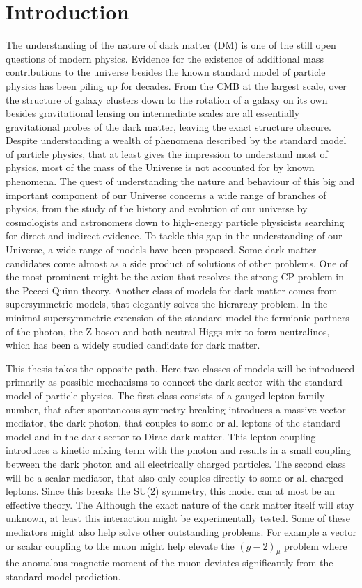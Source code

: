 \chapter{Introduction}
The understanding of the nature of dark matter (DM) is one of the still open questions of modern physics. Evidence for the existence of additional mass contributions to the universe besides the known standard model of particle physics has been piling up for decades. From the CMB at the largest scale, over the structure of galaxy clusters down to the rotation of a galaxy on its own besides gravitational lensing on intermediate scales are all essentially gravitational probes of the dark matter, leaving the exact structure obscure. Despite understanding a wealth of phenomena described by the standard model of particle physics, that at least gives the impression to understand most of physics, most of the mass of the Universe is not accounted for by known phenomena. The quest of understanding the nature and behaviour of this big and important component of our Universe concerns a wide range of branches of physics, from the study of the history and evolution of our universe by cosmologists and astronomers down to high-energy particle physicists searching for direct and indirect evidence.
To tackle this gap in the understanding of our Universe, a wide range of models have been proposed. Some dark matter candidates come almost as a side product of solutions of other problems. One of the most prominent might be the axion that resolves the strong CP-problem in the Peccei-Quinn theory. Another class of models for dark matter comes from supersymmetric models, that elegantly solves the hierarchy problem. In the minimal supersymmetric extension of the standard model the fermionic partners of the photon, the Z boson and both neutral Higgs mix to form neutralinos, which has been a widely studied candidate for dark matter.

This thesis takes the opposite path. Here two classes of models will be introduced primarily as possible mechanisms to connect the dark sector with the standard model of particle physics. The first class consists of a gauged lepton-family number, that after spontaneous symmetry breaking introduces a massive vector mediator, the dark photon, that couples to some or all leptons of the standard model and in the dark sector to Dirac dark matter. This lepton coupling introduces a kinetic mixing term with the photon and results in a small coupling between the dark photon and all electrically charged particles. 
The second class will be a scalar mediator, that also only couples directly to some or all charged leptons. Since this breaks the SU(2) symmetry, this model can at most be an effective theory.
The  Although the exact nature of the dark matter itself will stay unknown, at least this interaction might be experimentally tested.  Some of these mediators might also help solve other outstanding problems. For example a vector or scalar coupling to the muon might help elevate the $(g-2)_\mu$ problem where the anomalous magnetic moment of the muon deviates significantly from the standard model prediction. 

